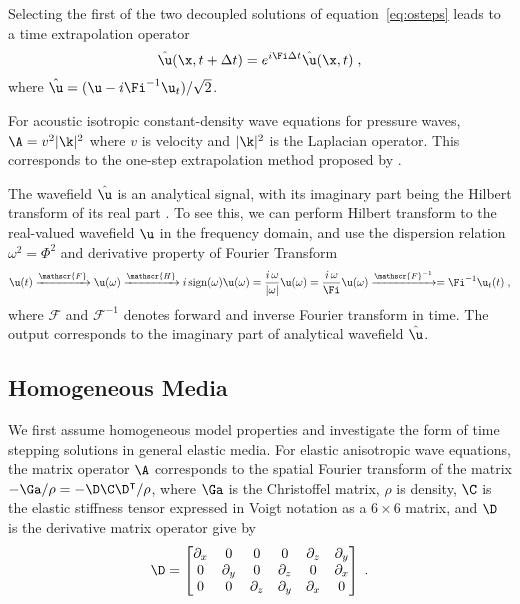 Selecting the first of the two decoupled solutions of equation~\ref{eq:osteps} leads to a time extrapolation operator
\begin{equation}
\label{eq:os}
\hat{\u}(\x,t+\Delta t) = e^{i\Fi\Delta t} \hat{\u}(\x,t) \;,
\end{equation}
where $\hat{\u} =(\u-i\Fi^{-1}\u_t)/\sqrt{2}$.

For acoustic isotropic constant-density wave equations for pressure waves, $\A = v^2|\k|^2$ where $v$ is velocity and $|\k|^2$ is the Laplacian operator.  This corresponds to the one-step extrapolation method proposed by \cite[]{zhang09}.

The wavefield $\hat{\u}$ is an analytical signal, with its imaginary part being the Hilbert transform of its real part \cite[]{zhang09}. To see this, we can perform Hilbert transform to the real-valued wavefield $\u$ in the frequency domain, and use the dispersion relation $\omega^2 = \Phi^2$ and derivative property of Fourier Transform
\newcommand{\sign}{\text{sign}}
\begin{equation}
    \label{eq:hilb}
    \u(t) \xrightarrow{\mathscr{F}} \u(\omega) \xrightarrow{\mathscr{H}} i\,\sign(\omega) \u(\omega) = \frac{i\,\omega}{|\omega|} \u(\omega) = \frac{i\,\omega}{\Fi} \u(\omega) \xrightarrow{\mathscr{F}^{-1}} = \Fi^{-1}\u_t(t) \;,
\end{equation}
where $\mathscr{F}$ and $\mathscr{F}^{-1}$ denotes forward and inverse Fourier transform in time. The output corresponds to the imaginary part of analytical wavefield $\hat{\u}$.

\subsection{Homogeneous Media}
We first assume homogeneous model properties and investigate the form of time stepping solutions in general elastic media. For elastic anisotropic wave equations, the matrix operator $\A$ corresponds to the spatial Fourier transform of the matrix $-\Ga/\rho = -\D\C\D^\intercal/\rho$, where $\Ga$ is the Christoffel matrix, $\rho$ is density, $\C$ is the elastic stiffness tensor expressed in Voigt notation as a $6\times6$ matrix, and $\D$ is the derivative matrix operator give by
\begin{equation}
  \D=
  \begin{bmatrix}
    \partial_x & 0 & 0 & 0 & \partial_z & \partial_y \\
    0 & \partial_y & 0 & \partial_z & 0 & \partial_x \\
    0 & 0 & \partial_z & \partial_y & \partial_x & 0
  \end{bmatrix} \;.
\end{equation}

